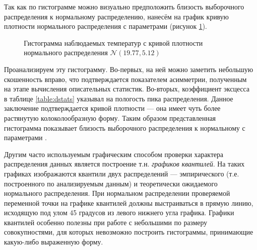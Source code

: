 Так как по гистограмме можно визуально предположить близость выборочного распределения к нормальному распределению, нанесём на график кривую плотности нормального распределения с параметрами \normaldistr (рисунок \ref{img:histogram_fitted}).
\begin{figure}[ht]
\caption{Гистограмма наблюдаемых температур с кривой плотности нормального распределения $\mathcal{N}(19.77, 5.12)$}
\label{img:histogram_fitted}
\end{figure}
Проанализируем эту гистограмму. Во-первых, на ней можно заметить небольшую скошенность вправо, что подтверждается показателем асимметрии, полученным на этапе вычисления описательных статистик. Во-вторых, коэффициент эксцесса в таблице \ref{table:dstats} указывал на пологость пика распределения. Данное заключение подтверждается кривой плотности --- она имеет чуть более растянутую колоколообразную форму. Таким образом представленная гистограмма показывает близость выборочного распределения к нормальному с параметрами \normaldistr.

Другим часто используемым графическим способом проверки характера распределения данных является построение т.н. \textit{графиков квантилей}. На таких графиках изображаются квантили двух распределений --- эмпирического (т.е. построенного по анализируемым данным) и теоретически ожидаемого нормального распределения. При нормальном распределении проверяемой переменной точки на графике квантилей должны выстраиваться в прямую линию, исходящую под улом 45 градусов из левого нижнего угла графика. Графики квантилей особенно полезны при работе с небольшими по размеру совокупностями, для которых невозможно построить гистограммы, принимающие какую-либо выраженную форму.


